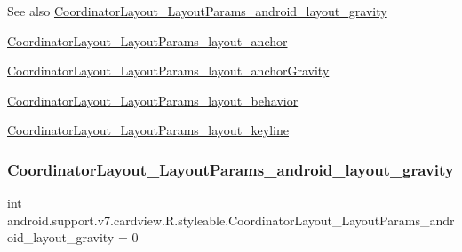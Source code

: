 \begin{DoxySeeAlso}{See also}
\hyperlink{classandroid_1_1support_1_1v7_1_1cardview_1_1R_1_1styleable_a7b843781d69c0606812c7b42334fffc0}{Coordinator\+Layout\+\_\+\+Layout\+Params\+\_\+android\+\_\+layout\+\_\+gravity} 

\hyperlink{classandroid_1_1support_1_1v7_1_1cardview_1_1R_1_1styleable_a9b8fc3c3e83fa23e3b7600c6fac01f94}{Coordinator\+Layout\+\_\+\+Layout\+Params\+\_\+layout\+\_\+anchor} 

\hyperlink{classandroid_1_1support_1_1v7_1_1cardview_1_1R_1_1styleable_a45b105447f04b1d7316dfedc36cf454f}{Coordinator\+Layout\+\_\+\+Layout\+Params\+\_\+layout\+\_\+anchor\+Gravity} 

\hyperlink{classandroid_1_1support_1_1v7_1_1cardview_1_1R_1_1styleable_a7b12af163a68314e93350a2fddb194d5}{Coordinator\+Layout\+\_\+\+Layout\+Params\+\_\+layout\+\_\+behavior} 

\hyperlink{classandroid_1_1support_1_1v7_1_1cardview_1_1R_1_1styleable_a8438ddb43a953883a300596ca7b1f39e}{Coordinator\+Layout\+\_\+\+Layout\+Params\+\_\+layout\+\_\+keyline} 
\end{DoxySeeAlso}
\mbox{\label{classandroid_1_1support_1_1v7_1_1cardview_1_1R_1_1styleable_a7b843781d69c0606812c7b42334fffc0}} 
\subsubsection{\texorpdfstring{Coordinator\+Layout\+\_\+\+Layout\+Params\+\_\+android\+\_\+layout\+\_\+gravity}{CoordinatorLayout\_LayoutParams\_android\_layout\_gravity}}
{\footnotesize\ttfamily int android.\+support.\+v7.\+cardview.\+R.\+styleable.\+Coordinator\+Layout\+\_\+\+Layout\+Params\+\_\+android\+\_\+layout\+\_\+gravity = 0\hspace{0.3cm}{\ttfamily [static]}}

